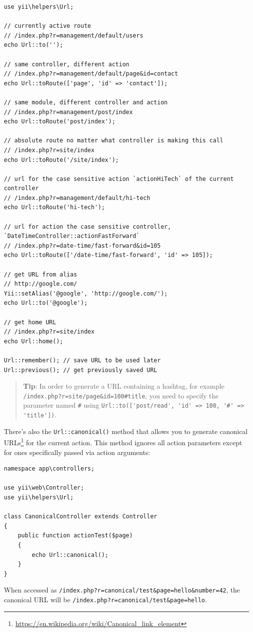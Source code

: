 \lstset{language=php}\begin{lstlisting}
use yii\helpers\Url;

// currently active route
// /index.php?r=management/default/users
echo Url::to('');

// same controller, different action
// /index.php?r=management/default/page&id=contact
echo Url::toRoute(['page', 'id' => 'contact']);

// same module, different controller and action
// /index.php?r=management/post/index
echo Url::toRoute('post/index');

// absolute route no matter what controller is making this call
// /index.php?r=site/index
echo Url::toRoute('/site/index');

// url for the case sensitive action `actionHiTech` of the current controller
// /index.php?r=management/default/hi-tech
echo Url::toRoute('hi-tech');

// url for action the case sensitive controller, `DateTimeController::actionFastForward`
// /index.php?r=date-time/fast-forward&id=105
echo Url::toRoute(['/date-time/fast-forward', 'id' => 105]);

// get URL from alias
// http://google.com/
Yii::setAlias('@google', 'http://google.com/');
echo Url::to('@google');

// get home URL
// /index.php?r=site/index
echo Url::home();

Url::remember(); // save URL to be used later
Url::previous(); // get previously saved URL
\end{lstlisting}
\begin{quote}\textbf{Tip}: In order to generate a URL containing a hashtag, for example \lstinline|/index.php?r=site/page&id=100#title|, you need to
  specify the parameter named \lstinline|#| using \lstinline|Url::to(['post/read', 'id' => 100, '#' => 'title'])|.

\end{quote}
There's also the \lstinline|Url::canonical()| method that allows you to generate
canonical URLs\footnote{\url{https://en.wikipedia.org/wiki/Canonical\_link\_element}} for the current action.
This method ignores all action parameters except for ones specifically passed via action arguments:

\lstset{language=php}\begin{lstlisting}
namespace app\controllers;

use yii\web\Controller;
use yii\helpers\Url;

class CanonicalController extends Controller
{
    public function actionTest($page)
    {
        echo Url::canonical();
    }
}
\end{lstlisting}
When accessed as \lstinline|/index.php?r=canonical/test&page=hello&number=42|, the canonical URL will be \lstinline|/index.php?r=canonical/test&page=hello|.

